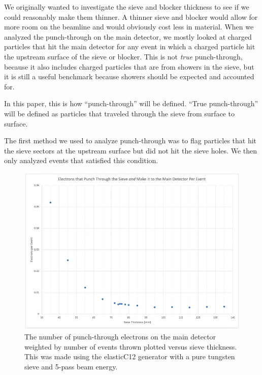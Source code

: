 We originally wanted to investigate the sieve and blocker thickness to see if we could reasonably make them thinner. A thinner sieve and blocker would allow for more room on the beamline and would obviously cost less in material. When we analyzed the punch-through on the main detector, we mostly looked at charged particles that hit the main detector for any event in which a charged particle hit the upstream surface of the sieve or blocker. This is not \emph{true} punch-through, because it also includes charged particles that are from showers in the sieve, but it is still a useful benchmark because showers should be expected and accounted for. 

In this paper, this is how ``punch-through'' will be defined. ``True punch-through'' will be defined as particles that traveled through the sieve from surface to surface.

The first method we used to analyze punch-through was to flag particles that hit the sieve sectors at the upstream surface but did not hit the sieve holes. We then only analyzed events that satisfied this condition.

\begin{figure}[H]
    \centering
    \includegraphics[scale=0.5]{Images/PunchThroughPerEvent_09082021.png}
    \caption{The number of punch-through electrons on the main detector weighted by number of events thrown plotted versus sieve thickness. This was made using the elasticC12 generator with a pure tungsten sieve and 5-pass beam energy.}
    \label{fig:sieve_electron_punchthrough}
\end{figure}


